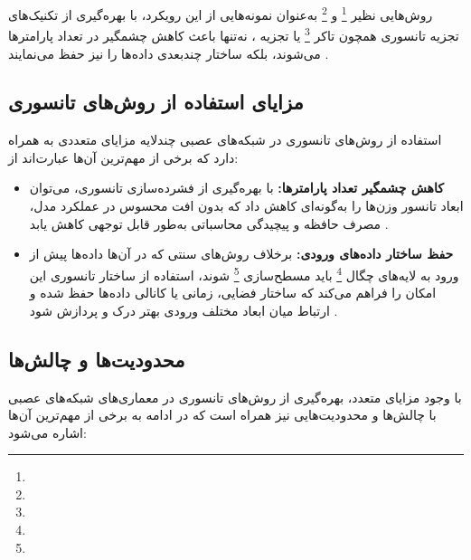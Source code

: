 روش‌هایی نظیر  \footnote{} و  \footnote{} به‌عنوان نمونه‌هایی از این رویکرد، با بهره‌گیری از تکنیک‌های تجزیه تانسوری همچون تاکر \footnote{} یا تجزیه ، نه‌تنها باعث کاهش چشمگیر در تعداد پارامترها می‌شوند، بلکه ساختار چندبعدی داده‌ها را نیز حفظ می‌نمایند \cite{kossaifi2017tensorcontraction, kossaifi2020tensorregression}.

\subsection*{مزایای استفاده از روش‌های تانسوری}

استفاده از روش‌های تانسوری در شبکه‌های عصبی چندلایه مزایای متعددی به همراه دارد که برخی از مهم‌ترین آن‌ها عبارت‌اند از:

\begin{itemize}
	\item \textbf{کاهش چشمگیر تعداد پارامترها:} با بهره‌گیری از فشرده‌سازی تانسوری، می‌توان ابعاد تانسور وزن‌ها را به‌گونه‌ای کاهش داد که بدون افت محسوس در عملکرد مدل، مصرف حافظه و پیچیدگی محاسباتی به‌طور قابل توجهی کاهش یابد \cite{lebedev2015cp, kossaifi2020tensorregression}.
	
	\item \textbf{حفظ ساختار داده‌های ورودی:} برخلاف روش‌های سنتی که در آن‌ها داده‌ها پیش از ورود به لایه‌های چگال \footnote{} باید مسطح‌سازی \footnote{} شوند، استفاده از ساختار تانسوری این امکان را فراهم می‌کند که ساختار فضایی، زمانی یا کانالی داده‌ها حفظ شده و ارتباط میان ابعاد مختلف ورودی بهتر درک و پردازش شود \cite{kossaifi2020tensorregression}.
\end{itemize}

\subsection*{محدودیت‌ها و چالش‌ها}

با وجود مزایای متعدد، بهره‌گیری از روش‌های تانسوری در معماری‌های شبکه‌های عصبی با چالش‌ها و محدودیت‌هایی نیز همراه است که در ادامه به برخی از مهم‌ترین آن‌ها اشاره می‌شود:

